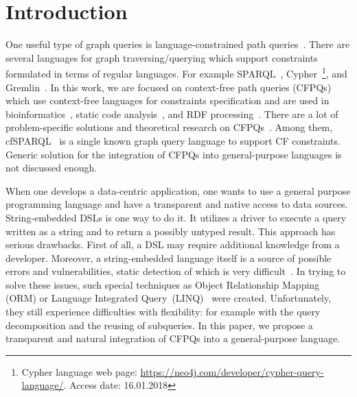 \section{Introduction}

One useful type of graph queries is language-constrained path queries~\cite{FLCpathProblem}.
There are several languages for graph traversing/querying which support constraints formulated in terms of regular languages.
For example SPARQL~\cite{sparql}, Cypher~\footnote{Cypher language web page: \url{https://neo4j.com/developer/cypher-query-language/}. Access date: 16.01.2018}, and Gremlin~\cite{gremlin}.
In this work, we are focused on context-free path queries (CFPQs) which use context-free languages for constraints specification and are used in bioinformatics~\cite{GraphQueryWithEarley}, static code analysis~\cite{Reps, Zheng, LabelFlowCFLReachability, specificationCFLReachability, JavaCFL}, and RDF processing~\cite{CFGonRDF}. 
There are a lot of problem-specific solutions and theoretical research on CFPQs~\cite{Yannakakis, ConjCFPathQuery, Hellings16, GrigorevR16, QueryGraphWithData, RegularDBQuery, GraphQueryWithEarley, graphDB}.
Among them, cfSPARQL~\cite{CFGonRDF} is a single known graph query language to support CF constraints. Generic solution for the integration of CFPQs into general-purpose languages is not discussed enough.

When one develops a data-centric application, one wants to use a general purpose programming language and have a transparent and native access to data sources.
String-embedded DSLs is one way to do it. 
It utilizes a driver to execute a query written as a string and to return a possibly untyped result. 
This approach has serious drawbacks.
First of all, a DSL may require additional knowledge from a developer.
Moreover, a string-embedded language itself is a source of possible errors and vulnerabilities, static detection of which is very difficult~\cite{stringEmbeddedLanguagesProblem}.  
In trying to solve these issues, such special techniques as Object Relationship Mapping (ORM) or Language Integrated Query~(LINQ)~\cite{LINQ1, LINQ2, LinqRDF} were created. Unfortunately, they still experience difficulties with flexibility: for example with the query decomposition and the reusing of subqueries.
In this paper, we propose a transparent and natural integration of CFPQs into a general-purpose language. 

